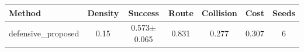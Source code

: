\begin{tabular}{lcccccc}
\toprule
Method & Density & Success & Route & Collision & Cost & Seeds \\ 
\midrule
defensive_proposed & 0.15 & 0.573$\pm$0.065 & 0.831 & 0.277 & 0.307 & 6 \\ 
\bottomrule
\end{tabular}
